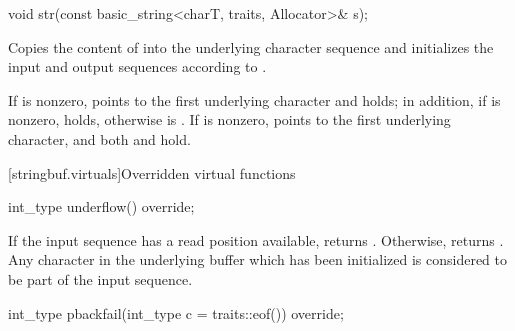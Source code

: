 %
\begin{itemdecl}
void str(const basic_string<charT, traits, Allocator>& s);
\end{itemdecl}

\begin{itemdescr}
\pnum
\effects
Copies the content of  into the  underlying character
sequence and initializes the input and output sequences according to .

\pnum
\postconditions If  is nonzero,  points to the
first underlying character and   holds; in
addition, if  is nonzero,
holds, otherwise  is . If  is
nonzero,  points to the first underlying character, and both  and  hold.
\end{itemdescr}

[stringbuf.virtuals]{Overridden virtual functions}

%
\begin{itemdecl}
int_type underflow() override;
\end{itemdecl}

\begin{itemdescr}
\pnum
\returns
If the input sequence has a read position available,
returns
.
Otherwise, returns
.
Any character in the underlying buffer which has been initialized is considered
to be part of the input sequence. 
\end{itemdescr}

%
\begin{itemdecl}
int_type pbackfail(int_type c = traits::eof()) override;
\end{itemdecl}

